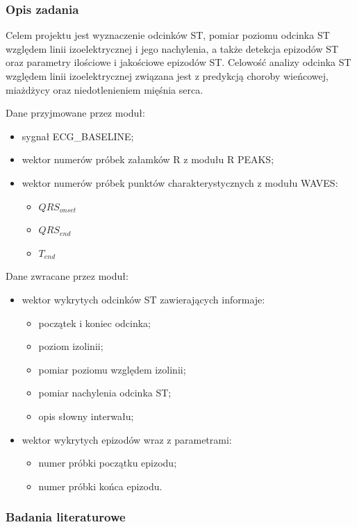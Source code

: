 \documentclass[a4paper, 11pt]{article}
\begin{document}
\subsubsection{Opis zadania}
\label{sec:st_interval:desc}
Celem projektu jest wyznaczenie odcinków ST, pomiar poziomu odcinka ST względem
linii izoelektrycznej i jego nachylenia, a także detekcja epizodów ST oraz
parametry ilościowe i jakościowe epizodów ST. Celowość analizy odcinka ST
względem linii izoelektrycznej związana jest z predykcją choroby wieńcowej,
miażdżycy oraz niedotlenieniem mięśnia serca.

Dane przyjmowane przez moduł:
\begin{itemize}
  \item sygnał ECG\_BASELINE;
  \item wektor numerów próbek załamków R z modułu R PEAKS;
  \item wektor numerów próbek punktów charakterystycznych z modułu WAVES:
  \begin{itemize}
    \item $QRS_{onset}$
    \item $QRS_{end}$
    \item $T_{end}$
  \end{itemize}  
\end{itemize}

Dane zwracane przez moduł:
\begin{itemize}
  \item wektor wykrytych odcinków ST zawierających informaje:
  \begin{itemize}
    \item początek i koniec odcinka;
    \item poziom izolinii;
    \item pomiar poziomu względem izolinii;
    \item pomiar nachylenia odcinka ST;
    \item opis słowny interwału;
  \end{itemize}
  \item wektor wykrytych epizodów wraz z parametrami:
  \begin{itemize}
    \item numer próbki początku epizodu;
    \item numer próbki końca epizodu.
  \end{itemize}
\end{itemize}

\subsubsection{Badania literaturowe}
\label{sec:st_interval:papers}
\end{document}
